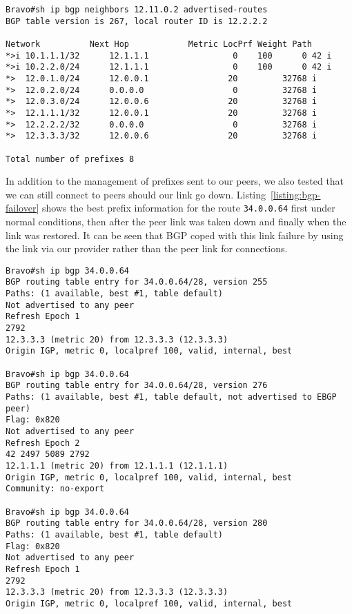 \begin{lstlisting}[caption={Prefixes advertised to AS 5607}, label={listing:bravo-advert-table}]
Bravo#sh ip bgp neighbors 12.11.0.2 advertised-routes
BGP table version is 267, local router ID is 12.2.2.2

Network          Next Hop            Metric LocPrf Weight Path
*>i 10.1.1.1/32      12.1.1.1                 0    100      0 42 i
*>i 10.2.2.0/24      12.1.1.1                 0    100      0 42 i
*>  12.0.1.0/24      12.0.0.1                20         32768 i
*>  12.0.2.0/24      0.0.0.0                  0         32768 i
*>  12.0.3.0/24      12.0.0.6                20         32768 i
*>  12.1.1.1/32      12.0.0.1                20         32768 i
*>  12.2.2.2/32      0.0.0.0                  0         32768 i
*>  12.3.3.3/32      12.0.0.6                20         32768 i

Total number of prefixes 8
\end{lstlisting}

In addition to the management of prefixes sent to our peers, we also tested
that we can still connect to peers should our link go down.
Listing~\ref{listing:bgp-failover} shows the best prefix information for the
route \texttt{34.0.0.64} first under normal conditions, then after the peer
link was taken down and finally when the link was restored. It can be seen that
BGP coped with this link failure by using the link via our provider rather than
the peer link for connections.

\begin{lstlisting}[caption={Failover of connection to AS 2792}, label={listing:bgp-failover}]
Bravo#sh ip bgp 34.0.0.64
BGP routing table entry for 34.0.0.64/28, version 255
Paths: (1 available, best #1, table default)
Not advertised to any peer
Refresh Epoch 1
2792
12.3.3.3 (metric 20) from 12.3.3.3 (12.3.3.3)
Origin IGP, metric 0, localpref 100, valid, internal, best

Bravo#sh ip bgp 34.0.0.64
BGP routing table entry for 34.0.0.64/28, version 276
Paths: (1 available, best #1, table default, not advertised to EBGP peer)
Flag: 0x820
Not advertised to any peer
Refresh Epoch 2
42 2497 5089 2792
12.1.1.1 (metric 20) from 12.1.1.1 (12.1.1.1)
Origin IGP, metric 0, localpref 100, valid, internal, best
Community: no-export

Bravo#sh ip bgp 34.0.0.64
BGP routing table entry for 34.0.0.64/28, version 280
Paths: (1 available, best #1, table default)
Flag: 0x820
Not advertised to any peer
Refresh Epoch 1
2792
12.3.3.3 (metric 20) from 12.3.3.3 (12.3.3.3)
Origin IGP, metric 0, localpref 100, valid, internal, best
\end{lstlisting}

